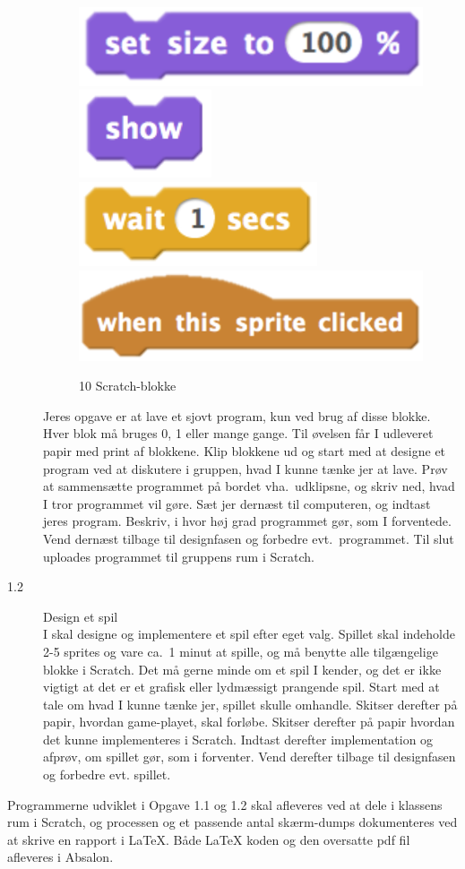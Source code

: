 \documentclass[a4paper,12pt]{article}
\begin{document}
\begin{description}
\begin{figure}
    \includegraphics[height=0.04\paperheight]{setSize.png}
    \includegraphics[height=0.04\paperheight]{show.png}
    \includegraphics[height=0.04\paperheight]{wait.png}
    \includegraphics[height=0.055\paperheight]{when.png}
    \caption{10 Scratch-blokke}
    \label{fig:blokke}
  \end{figure}
Jeres opgave er at
  lave et sjovt program, kun ved brug af disse blokke. Hver blok må
  bruges 0, 1 eller mange gange. Til øvelsen får I udleveret papir med
  print af blokkene. Klip blokkene ud og start med at designe et
  program ved at diskutere i gruppen, hvad I kunne tænke jer at
  lave. Prøv at sammensætte programmet på bordet vha.\ udklipsne, og
  skriv ned, hvad I tror programmet vil gøre. Sæt jer dernæst til
  computeren, og indtast jeres program. Beskriv, i hvor høj grad
  programmet gør, som I forventede. Vend dernæst tilbage til
  designfasen og forbedre evt.\ programmet. Til slut uploades
  programmet til gruppens rum i Scratch.
\item[1.2] Design et spil\\
  I skal designe og implementere et spil efter eget valg. Spillet skal
  indeholde 2-5 sprites og vare ca.\ 1 minut at spille, og må benytte
  alle tilgængelige blokke i Scratch. Det må gerne
  minde om et spil I kender, og det er ikke vigtigt at det er et
  grafisk eller lydmæssigt prangende spil. Start med at tale om hvad I
  kunne tænke jer, spillet skulle omhandle. Skitser derefter på papir,
  hvordan game-playet, skal forløbe. Skitser derefter på papir hvordan
  det kunne implementeres i Scratch. Indtast derefter implementation
  og afprøv, om spillet gør, som i forventer. Vend derefter tilbage
  til designfasen og forbedre evt. spillet.
\end{description}
Programmerne udviklet i Opgave 1.1 og 1.2 skal afleveres ved at dele i
klassens rum i Scratch, og processen og et passende antal skærm-dumps
dokumenteres ved at skrive en rapport i LaTeX. Både LaTeX koden og den
oversatte pdf fil afleveres i Absalon.
\end{document}
